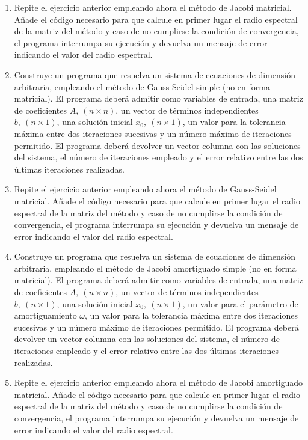 \begin{enumerate}
\item Repite el ejercicio anterior empleando ahora el método de Jacobi matricial. Añade el código necesario para que calcule en primer lugar el radio espectral de la matriz del método y caso de no cumplirse  la condición de convergencia, el programa interrumpa su ejecución y devuelva un mensaje de error indicando el valor del radio espectral.

\item Construye un programa que resuelva un sistema de ecuaciones de dimensión arbitraria, empleando el método de Gauss-Seidel simple (no en forma matricial). El programa deberá admitir como variables de entrada, una matriz de coeficientes $ A,\ (n\times n)$, un vector de términos independientes $b,\ (n\times 1)$, una solución inicial $x_0 ,\ (n\times 1)$, un valor para la tolerancia máxima entre dos iteraciones sucesivas y un número máximo de iteraciones permitido. El programa deberá devolver un vector columna con las soluciones del sistema, el número de iteraciones empleado y el error relativo entre las dos últimas iteraciones realizadas.

\item Repite el ejercicio anterior empleando ahora el método de Gauss-Seidel matricial. Añade el código necesario para que calcule en primer lugar el radio espectral de la matriz del método y caso de no cumplirse  la condición de convergencia, el programa interrumpa su ejecución y devuelva un mensaje de error indicando el valor del radio espectral.

\item Construye un programa que resuelva un sistema de ecuaciones de dimensión arbitraria, empleando el método de Jacobi amortiguado simple (no en forma matricial). El programa deberá admitir como variables de entrada, una matriz de coeficientes $ A,\ (n\times n)$, un vector de términos independientes $b,\ (n\times 1)$, una solución inicial $x_0 ,\ (n\times 1)$, un valor para el parámetro de amortiguamiento $\omega$, un valor para la tolerancia máxima entre dos iteraciones sucesivas y un número máximo de iteraciones permitido. El programa deberá devolver un vector columna con las soluciones del sistema, el número de iteraciones empleado y el error relativo entre las dos últimas iteraciones realizadas.

\item Repite el ejercicio anterior empleando ahora el método de Jacobi amortiguado matricial. Añade el código necesario para que calcule en primer lugar el radio espectral de la matriz del método y caso de no cumplirse  la condición de convergencia, el programa interrumpa su ejecución y devuelva un mensaje de error indicando el valor del radio espectral.


\end{enumerate}
